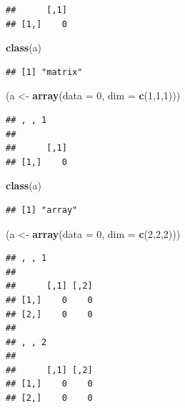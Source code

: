 \documentclass[]{book}
\newenvironment{Shaded}{\begin{snugshade}}{\end{snugshade}}
\newcommand{\KeywordTok}[1]{\textcolor[rgb]{0.13,0.29,0.53}{\textbf{#1}}}
\newcommand{\DataTypeTok}[1]{\textcolor[rgb]{0.13,0.29,0.53}{#1}}
\newcommand{\DecValTok}[1]{\textcolor[rgb]{0.00,0.00,0.81}{#1}}
\newcommand{\StringTok}[1]{\textcolor[rgb]{0.31,0.60,0.02}{#1}}
\newcommand{\NormalTok}[1]{#1}
\theoremstyle{definition}
\theoremstyle{definition}
\theoremstyle{definition}
\theoremstyle{remark}
\begin{document}
\begin{verbatim}
##      [,1]
## [1,]    0
\end{verbatim}

\begin{Shaded}
\begin{Highlighting}[]
\KeywordTok{class}\NormalTok{(a)}
\end{Highlighting}
\end{Shaded}

\begin{verbatim}
## [1] "matrix"
\end{verbatim}

\begin{Shaded}
\begin{Highlighting}[]
\NormalTok{(a <-}\StringTok{ }\KeywordTok{array}\NormalTok{(}\DataTypeTok{data =} \DecValTok{0}\NormalTok{, }\DataTypeTok{dim =} \KeywordTok{c}\NormalTok{(}\DecValTok{1}\NormalTok{,}\DecValTok{1}\NormalTok{,}\DecValTok{1}\NormalTok{)))}
\end{Highlighting}
\end{Shaded}

\begin{verbatim}
## , , 1
## 
##      [,1]
## [1,]    0
\end{verbatim}

\begin{Shaded}
\begin{Highlighting}[]
\KeywordTok{class}\NormalTok{(a)}
\end{Highlighting}
\end{Shaded}

\begin{verbatim}
## [1] "array"
\end{verbatim}

\begin{Shaded}
\begin{Highlighting}[]
\NormalTok{(a <-}\StringTok{ }\KeywordTok{array}\NormalTok{(}\DataTypeTok{data =} \DecValTok{0}\NormalTok{, }\DataTypeTok{dim =} \KeywordTok{c}\NormalTok{(}\DecValTok{2}\NormalTok{,}\DecValTok{2}\NormalTok{,}\DecValTok{2}\NormalTok{)))}
\end{Highlighting}
\end{Shaded}

\begin{verbatim}
## , , 1
## 
##      [,1] [,2]
## [1,]    0    0
## [2,]    0    0
## 
## , , 2
## 
##      [,1] [,2]
## [1,]    0    0
## [2,]    0    0
\end{verbatim}
\end{document}
